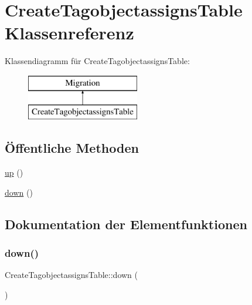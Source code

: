 \hypertarget{classCreateTagobjectassignsTable}{}\section{Create\+Tagobjectassigns\+Table Klassenreferenz}
\label{classCreateTagobjectassignsTable}
Klassendiagramm für Create\+Tagobjectassigns\+Table\+:\begin{figure}[H]
\begin{center}
\leavevmode
\includegraphics[height=2.000000cm]{d3/dc6/classCreateTagobjectassignsTable}
\end{center}
\end{figure}
\subsection*{Öffentliche Methoden}
\begin{DoxyCompactItemize}
\item 
\hyperlink{classCreateTagobjectassignsTable_a08a1d748f8a2d14c425a7b1df518619c}{up} ()
\item 
\hyperlink{classCreateTagobjectassignsTable_a6b9e7c10bf61127b2a33b9d373d85215}{down} ()
\end{DoxyCompactItemize}


\subsection{Dokumentation der Elementfunktionen}
\mbox{\label{classCreateTagobjectassignsTable_a6b9e7c10bf61127b2a33b9d373d85215}} 
\subsubsection{\texorpdfstring{down()}{down()}}
{\footnotesize\ttfamily Create\+Tagobjectassigns\+Table\+::down (\begin{DoxyParamCaption}{ }\end{DoxyParamCaption})}

